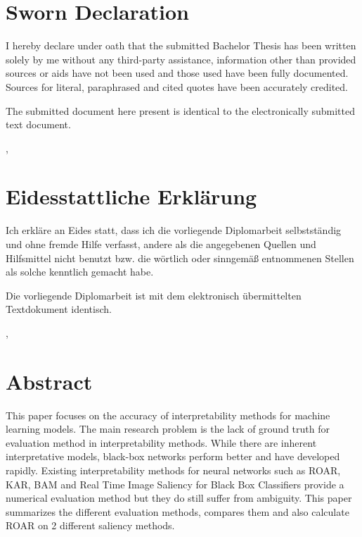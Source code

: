 
	\ifeng \chapter*{Sworn Declaration}
	I hereby declare under oath that the submitted Bachelor Thesis has been written solely by me without any third-party assistance, information other than provided sources or aids have not been used and those used have been fully documented. Sources for literal, paraphrased and cited quotes have been accurately credited.

	The submitted document here present is identical to the electronically submitted text document.

	\vskip1cm
	\place, \date

	\else \chapter*{Eidesstattliche Erklärung}
	Ich erkläre an Eides statt, dass ich die vorliegende Diplomarbeit selbstständig und ohne fremde Hilfe verfasst, andere als die angegebenen Quellen und Hilfsmittel nicht benutzt bzw. die wörtlich oder sinngemäß entnommenen Stellen als solche kenntlich gemacht habe.

	Die vorliegende Diplomarbeit ist mit dem elektronisch übermittelten Textdokument identisch.

	\vskip1cm
	\place, \date
	\fi

		\chapter*{Abstract}

	This paper focuses on the accuracy of interpretability methods for machine learning models. The main research problem is the lack of ground truth for evaluation method in interpretability methods. While there are inherent interpretative models, black-box networks perform better and have developed rapidly. Existing interpretability methods for neural networks such as ROAR, KAR, BAM and Real Time Image Saliency for Black Box Classifiers provide a numerical evaluation method but they do still suffer from ambiguity.
	This paper summarizes the different evaluation methods, compares them and also calculate ROAR on 2 different saliency methods.
	
	


